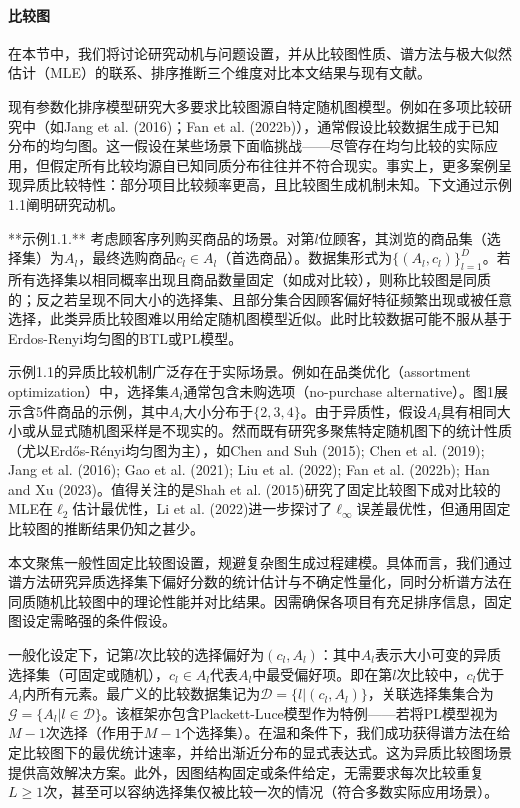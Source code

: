 \paragraph{比较图}
在本节中，我们将讨论研究动机与问题设置，并从比较图性质、谱方法与极大似然估计（MLE）的联系、排序推断三个维度对比本文结果与现有文献。

现有参数化排序模型研究大多要求比较图源自特定随机图模型。例如在多项比较研究中（如Jang et al. (2016)；Fan et al. (2022b)），通常假设比较数据生成于已知分布的均匀图。这一假设在某些场景下面临挑战——尽管存在均匀比较的实际应用，但假定所有比较均源自已知同质分布往往并不符合现实。事实上，更多案例呈现异质比较特性：部分项目比较频率更高，且比较图生成机制未知。下文通过示例1.1阐明研究动机。

**示例1.1.** 考虑顾客序列购买商品的场景。对第$l$位顾客，其浏览的商品集（选择集）为$A_l$，最终选购商品$c_l \in A_l$（首选商品）。数据集形式为$\{(A_l,c_l)\}_{l=1}^D$。若所有选择集以相同概率出现且商品数量固定（如成对比较），则称比较图是同质的；反之若呈现不同大小的选择集、且部分集合因顾客偏好特征频繁出现或被任意选择，此类异质比较图难以用给定随机图模型近似。此时比较数据可能不服从基于Erdos-Renyi均匀图的BTL或PL模型。

示例1.1的异质比较机制广泛存在于实际场景。例如在品类优化（assortment optimization）中，选择集$A_l$通常包含未购选项（no-purchase alternative）。图1展示含5件商品的示例，其中$A_l$大小分布于$\{2,3,4\}$。由于异质性，假设$A_l$具有相同大小或从显式随机图采样是不现实的。然而既有研究多聚焦特定随机图下的统计性质（尤以Erdős-Rényi均匀图为主），如Chen and Suh (2015); Chen et al. (2019); Jang et al. (2016); Gao et al. (2021); Liu et al. (2022); Fan et al. (2022b); Han and Xu (2023)。值得关注的是Shah et al. (2015)研究了固定比较图下成对比较的MLE在$\ell_2$估计最优性，Li et al. (2022)进一步探讨了$\ell_{\infty}$误差最优性，但通用固定比较图的推断结果仍知之甚少。

本文聚焦一般性固定比较图设置，规避复杂图生成过程建模。具体而言，我们通过谱方法研究异质选择集下偏好分数的统计估计与不确定性量化，同时分析谱方法在同质随机比较图中的理论性能并对比结果。因需确保各项目有充足排序信息，固定图设定需略强的条件假设。

一般化设定下，记第$l$次比较的选择偏好为$(c_l,A_l)$：其中$A_l$表示大小可变的异质选择集（可固定或随机），$c_l \in A_l$代表$A_l$中最受偏好项。即在第$l$次比较中，$c_l$优于$A_l$内所有元素。最广义的比较数据集记为$\mathcal{D} = \{l|(c_l,A_l)\}$，关联选择集集合为$\mathcal{G} = \{A_l|l\in \mathcal{D}\}$。该框架亦包含Plackett-Luce模型作为特例——若将PL模型视为$M-1$次选择（作用于$M-1$个选择集）。在温和条件下，我们成功获得谱方法在给定比较图下的最优统计速率，并给出渐近分布的显式表达式。这为异质比较图场景提供高效解决方案。此外，因图结构固定或条件给定，无需要求每次比较重复$L\geq 1$次，甚至可以容纳选择集仅被比较一次的情况（符合多数实际应用场景）。


